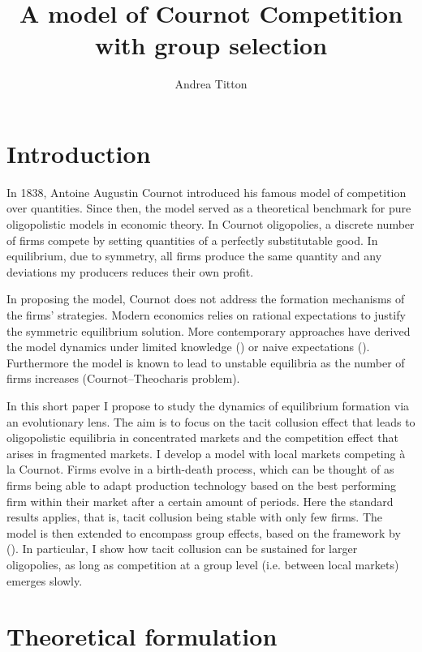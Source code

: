 \documentclass[american]{scrartcl}
\title{A model of Cournot Competition with group selection}
\author{Andrea Titton}
\begin{document}

\maketitle

\section{Introduction}

In 1838, Antoine Augustin Cournot introduced his famous model of competition over quantities. Since then, the model served as a theoretical benchmark for pure oligopolistic models in economic theory. In Cournot oligopolies, a discrete number of firms compete by setting quantities of a perfectly substitutable good. In equilibrium, due to symmetry, all firms produce the same quantity and any deviations my producers reduces their own profit.

In proposing the model, Cournot does not address the formation mechanisms of the firms' strategies. Modern economics relies on rational expectations to justify the symmetric equilibrium solution. More contemporary approaches have derived the model dynamics under limited knowledge (\cite{Bischi2015}) or naive expectations (\cite{Cnovas2008}). Furthermore the model is known to lead to unstable equilibria as the number of firms increases (Cournot–Theocharis problem).

In this short paper I propose to study the dynamics of equilibrium formation via an evolutionary lens. The aim is to focus on the tacit collusion effect that leads to oligopolistic equilibria in concentrated markets and the competition effect that arises in fragmented markets. I develop a model with local markets competing à la Cournot. Firms evolve in a birth-death process, which can be thought of as firms being able to adapt production technology based on the best performing firm within their market after a certain amount of periods. Here the standard results applies, that is, tacit collusion being stable with only few firms. The model is then extended to encompass group effects, based on the framework by \citeauthor{Akdeniz2020} (\citeyear{Akdeniz2020}). In particular, I show how tacit collusion can be sustained for larger oligopolies, as long as competition at a group level (i.e. between local markets) emerges slowly.


\section{Theoretical formulation}
\end{document}
